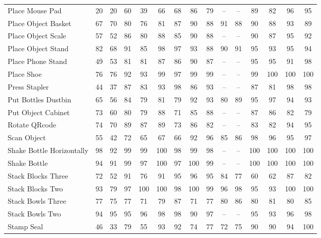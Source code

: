 \documentclass{llmxive}
\begin{document}
\begin{table}[tp]
{\begin{tabular}{l*{14}{c}}
        Place Mouse Pad             & 20 & 20 & 60 & 39 & 66 & 68 & 86 & 79 & -- & -- & 89 & 82 & 96 & 95 \\
        Place Object Basket         & 67 & 70 & 80 & 76 & 81 & 87 & 90 & 88 & 91 & 88 & 90 & 88 & 93 & 89 \\
        Place Object Scale          & 57 & 52 & 86 & 80 & 88 & 85 & 90 & 88 & -- & -- & 90 & 87 & 95 & 92 \\
        Place Object Stand          & 82 & 68 & 91 & 85 & 98 & 97 & 93 & 88 & 90 & 91 & 95 & 93 & 95 & 94 \\
        Place Phone Stand           & 49 & 53 & 81 & 81 & 87 & 86 & 90 & 87 & -- & -- & 95 & 95 & 91 & 98 \\
        Place Shoe                  & 76 & 76 & 92 & 93 & 99 & 97 & 99 & 99 & -- & -- & 99 & 100 & 100 & 100 \\
        Press Stapler               & 44 & 37 & 87 & 83 & 93 & 98 & 86 & 93 & -- & -- & 87 & 81 & 98 & 98 \\
        Put Bottles Dustbin         & 65 & 56 & 84 & 79 & 81 & 79 & 92 & 93 & 80 & 89 & 95 & 97 & 94 & 93 \\
        Put Object Cabinet          & 73 & 60 & 80 & 79 & 88 & 71 & 85 & 88 & -- & -- & 87 & 86 & 82 & 79 \\
        Rotate QRcode               & 74 & 70 & 89 & 87 & 89 & 73 & 86 & 82 & -- & -- & 83 & 82 & 94 & 95 \\
        Scan Object                 & 55 & 42 & 72 & 65 & 67 & 66 & 92 & 96 & 85 & 86 & 98 & 96 & 95 & 97 \\
        Shake Bottle Horizontally   & 98 & 92 & 99 & 99 & 100 & 98 & 99 & 98 & -- & -- & 100 & 100 & 100 & 100 \\
        Shake Bottle                & 94 & 91 & 99 & 97 & 100 & 97 & 100 & 99 & -- & -- & 100 & 100 & 100 & 100 \\
        Stack Blocks Three          & 72 & 52 & 91 & 76 & 91 & 95 & 96 & 95 & 84 & 77 & 60 & 62 & 87 & 82 \\
        Stack Blocks Two            & 93 & 79 & 97 & 100 & 100 & 98 & 100 & 99 & 96 & 98 & 95 & 93 & 100 & 100 \\
        Stack Bowls Three           & 77 & 75 & 77 & 71 & 79 & 87 & 71 & 77 & 80 & 86 & 80 & 81 & 80 & 85 \\
        Stack Bowls Two             & 94 & 95 & 95 & 96 & 98 & 98 & 90 & 97 & -- & -- & 95 & 93 & 96 & 98 \\
        Stamp Seal                  & 46 & 33 & 79 & 55 & 93 & 92 & 74 & 77 & 72 & 75 & 90 & 90 & 94 & 100 \\

\end{tabular}}
\end{table}
\end{document}
